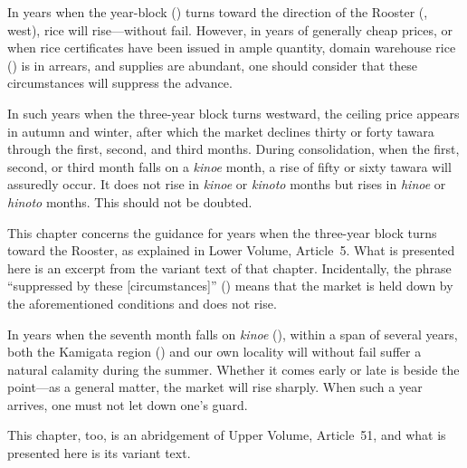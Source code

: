 
\begin{sokyubox}
{\small\itshape\color{sokyubar} }

\medskip
In years when the year-block () turns toward the
direction of the Rooster (, west), rice will rise---without fail.
However, in years of generally cheap prices, or when rice certificates have
been issued in ample quantity, domain warehouse rice ()
is in arrears, and supplies are abundant, one should consider that these
circumstances will suppress the advance.

In such years when the three-year block turns westward, the ceiling price
appears in autumn and winter, after which the market declines thirty or
forty tawara through the first, second, and third months. During
consolidation, when the first, second, or third month falls on a
\textit{kinoe} month, a rise of fifty or sixty tawara will assuredly
occur. It does not rise in \textit{kinoe} or \textit{kinoto} months but
rises in \textit{hinoe} or \textit{hinoto} months. This should not be
doubted.
\end{sokyubox}

\commentary
This chapter concerns the guidance for years when the three-year block
turns toward the Rooster, as explained in Lower Volume, Article~5. What is
presented here is an excerpt from the variant text of that chapter.
Incidentally, the phrase ``suppressed by these [circumstances]''
() means that the market is held down by the
aforementioned conditions and does not rise.


\begin{sokyubox}
{\small\itshape\color{sokyubar} }

\medskip
In years when the seventh month falls on \textit{kinoe} (), within
a span of several years, both the Kamigata region ()
and our own locality will without fail suffer a natural calamity during
the summer. Whether it comes early or late is beside the point---as a
general matter, the market will rise sharply. When such a year arrives,
one must not let down one's guard.
\end{sokyubox}

\commentary
This chapter, too, is an abridgement of Upper Volume, Article~51, and what
is presented here is its variant text.

